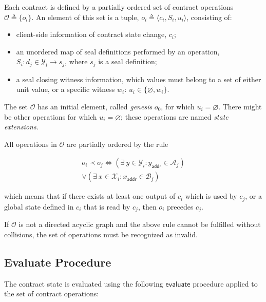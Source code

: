 \documentclass[9pt,oneside]{amsart}
\begin{document}
\begin{multicols}{2}
Each contract is defined by a partially ordered set of contract operations
$\mathcal{O} \triangleq \{ o_i \}$.
An element of this set is a tuple, $o_i \triangleq \langle c_i, S_i, u_i \rangle$, consisting of:
\begin{itemize}
\item client-side information of contract state change, $c_i$;
\item an unordered map of seal definitions performed by an operation, 
  $S_i: d_j \in \mathcal{Y}_i \rightarrow s_j$, where $s_j$ is a seal definition;
\item a seal closing witness information, 
  which values must belong to a set of either unit value, or a specific witness $w_i$: 
  $u_i \in \{ \varnothing, w_i \}$.
\end{itemize}

The set $\mathcal{O}$ has an initial element, called \emph{genesis} $o_0$, for which $u_i = \varnothing$.
There might be other operations for which $u_i = \varnothing$;
these operations are named \emph{state extensions}.

All operations in $\mathcal{O}$ are partially ordered by the rule

\begin{equation}
\begin{split}
o_i \prec o_j \Longleftrightarrow (\exists \ y \in \mathcal{Y}_i: y_\mathsf{addr} \in \mathcal{A}_j) \\
\vee (\exists \ x \in \mathcal{X}_i: x_\mathsf{addr} \in \mathcal{B}_j)
\end{split}
\end{equation}

which means that if there exists at least one output of $c_i$ which is used by $c_j$, or a global
state defined in $c_i$ that is read by $c_j$, then $o_i$ precedes $c_j$.

If $\mathcal{O}$ is not a directed acyclic graph and the above rule cannot be fulfilled without
collisions, the set of operations must be recognized as invalid.


\subsection{Evaluate Procedure}\label{Evaluate}

The contract state is evaluated using the following $\mathsf{evaluate}$
procedure applied to the set of contract operations:


\end{multicols}
\end{document}
